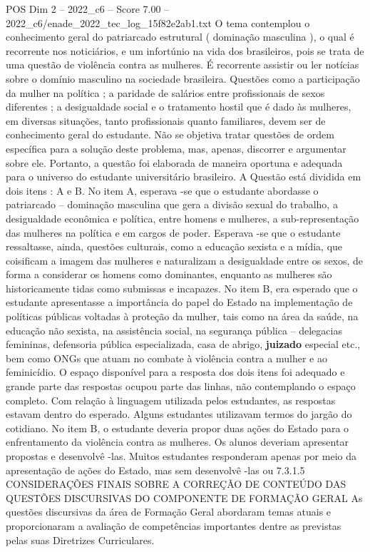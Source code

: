 \begin{textsample}{POS Dim 2 – 2022\_c6 – Score 7.00 – 2022\_c6/enade\_2022\_tec\_log\_15f82e2ab1.txt}
O tema contemplou o conhecimento geral do patriarcado estrutural ( dominação masculina ), o qual é recorrente nos noticiários, e um infortúnio na vida dos brasileiros, pois se trata de uma questão de violência contra as mulheres.
É recorrente assistir ou ler notícias sobre o domínio masculino na sociedade brasileira.
Questões como a participação da mulher na política ; a paridade de salários entre profissionais de sexos diferentes ; a desigualdade social e o tratamento hostil que é dado às mulheres, em diversas situações, tanto profissionais quanto familiares, devem ser de conhecimento geral do estudante.
Não se objetiva tratar questões de ordem específica para a solução deste problema, mas, apenas, discorrer e argumentar sobre ele.
Portanto, a questão foi elaborada de maneira oportuna e adequada para o universo do estudante universitário brasileiro.
A Questão está dividida em dois itens : A e B.
No item A, esperava -se que o estudante abordasse o patriarcado – dominação masculina que gera a divisão sexual do trabalho, a desigualdade econômica e política, entre homens e mulheres, a sub-representação das mulheres na política e em cargos de poder.
Esperava -se que o estudante ressaltasse, ainda, questões culturais, como a educação sexista e a mídia, que coisificam a imagem das mulheres e naturalizam a desigualdade entre os sexos, de forma a considerar os homens como dominantes, enquanto as mulheres são historicamente tidas como submissas e incapazes.
No item B, era esperado que o estudante apresentasse a importância do papel do Estado na implementação de políticas públicas voltadas à proteção da mulher, tais como na área da saúde, na educação não sexista, na assistência social, na segurança pública – delegacias femininas, defensoria pública especializada, casa de abrigo, \textbf{juizado} especial etc., bem como ONGs que atuam no combate à violência contra a mulher e ao feminicídio.
O espaço disponível para a resposta dos dois itens foi adequado e grande parte das respostas ocupou parte das linhas, não contemplando o espaço completo.
Com relação à linguagem utilizada pelos estudantes, as respostas estavam dentro do esperado.
Alguns estudantes utilizavam termos do jargão do cotidiano.
No item B, o estudante deveria propor duas ações do Estado para o enfrentamento da violência contra as mulheres.
Os alunos deveriam apresentar propostas e desenvolvê -las.
Muitos estudantes responderam apenas por meio da apresentação de ações do Estado, mas sem desenvolvê -las ou 7.3.1.5 CONSIDERAÇÕES FINAIS SOBRE A CORREÇÃO DE CONTEÚDO DAS QUESTÕES DISCURSIVAS DO COMPONENTE DE FORMAÇÃO GERAL As questões discursivas da área de Formação Geral abordaram temas atuais e proporcionaram a avaliação de competências importantes dentre as previstas pelas suas Diretrizes Curriculares.

\end{textsample}
